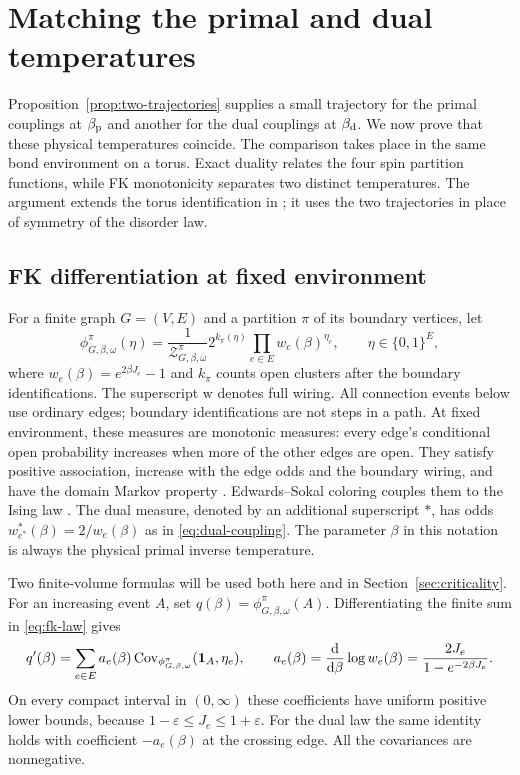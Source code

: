 \section{Matching the primal and dual temperatures}
\label{sec:matching}

Proposition~\ref{prop:two-trajectories} supplies a small trajectory for
the primal couplings at $\beta_{\rm p}$ and another for the dual
couplings at $\beta_{\rm d}$. We now prove that these physical
temperatures coincide. The comparison takes place in the same bond
environment on a torus. Exact duality relates the four spin partition
functions, while FK monotonicity separates two distinct temperatures.
The argument extends the torus identification in
\cite[Section~8, Proposition ``Identification of the tuned parameter'']{R};
it uses the two trajectories in place of symmetry of the disorder law.

\subsection{FK differentiation at fixed environment}

For a finite graph $G=(V,E)$ and a partition $\pi$ of its boundary
vertices, let
\begin{equation}
 \phi_{G,\beta,\omega}^{\pi}(\eta)
 =\frac{1}{\mathcal Z_{G,\beta,\omega}^{\pi}}
       2^{k_\pi(\eta)}\prod_{e\in E}w_e(\beta)^{\eta_e},
 \qquad \eta\in\{0,1\}^{E},
 \label{eq:fk-law}
\end{equation}
where $w_e(\beta)=e^{2\beta J_e}-1$ and $k_\pi$ counts open clusters
after the boundary identifications. The superscript $\mathrm w$
denotes full wiring. All connection events below use ordinary edges;
boundary identifications are not steps in a path. At fixed environment,
these measures are monotonic measures: every edge's conditional open
probability increases when more of the other edges are open. They
satisfy positive association, increase with the edge odds and the
boundary wiring, and have the domain Markov property
\cite{FK,FKG}. Edwards--Sokal coloring couples them to the Ising law
\cite{ES}. The dual measure, denoted by an additional superscript $*$,
has odds $w^*_{e^*}(\beta)=2/w_e(\beta)$ as in
\eqref{eq:dual-coupling}. The parameter $\beta$ in this notation is
always the physical primal inverse temperature.

Two finite-volume formulas will be used both here and in
Section~\ref{sec:criticality}. For an increasing event $A$, set
$q(\beta)=\phi_{G,\beta,\omega}^{\pi}(A)$. Differentiating the finite
sum in \eqref{eq:fk-law} gives
\begin{equation}
 q'(\beta)=\sum_{e\in E}a_e(\beta)
       \operatorname{Cov}_{\phi_{G,\beta,\omega}^{\pi}}(\mathbf 1_A,\eta_e),
 \qquad
 a_e(\beta)=\frac{\mathrm d}{\mathrm d\beta}\log w_e(\beta)
           =\frac{2J_e}{1-e^{-2\beta J_e}}.
 \label{eq:weighted-derivative}
\end{equation}
On every compact interval in $(0,\infty)$ these coefficients have
uniform positive lower bounds, because
$1-\varepsilon\le J_e\le1+\varepsilon$. For the dual law the same
identity holds with coefficient $-a_e(\beta)$ at the crossing edge.
All the covariances are nonnegative.

